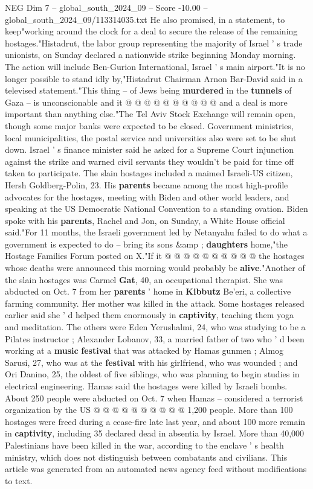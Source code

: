 \begin{textsample}{NEG Dim 7 – global\_south\_2024\_09 – Score -10.00 – global\_south\_2024\_09/113314035.txt}
He also promised, in a statement, to keep"working around the clock for a deal to secure the release of the remaining hostages."Histadrut, the labor group representing the majority of Israel ' s trade unionists, on Sunday declared a nationwide strike beginning Monday morning.
The action will include Ben-Gurion International, Israel ' s main airport."It is no longer possible to stand idly by,"Histadrut Chairman Arnon Bar-David said in a televised statement."This thing -- of Jews being \textbf{murdered} in the \textbf{tunnels} of Gaza -- is unconscionable and it @ @ @ @ @ @ @ @ @ @ and a deal is more important than anything else."The Tel Aviv Stock Exchange will remain open, though some major banks were expected to be closed.
Government ministries, local municipalities, the postal service and universities also were set to be shut down.
Israel ' s finance minister said he asked for a Supreme Court injunction against the strike and warned civil servants they wouldn't be paid for time off taken to participate.
The slain hostages included a maimed Israeli-US citizen, Hersh Goldberg-Polin, 23.
His \textbf{parents} became among the most high-profile advocates for the hostages, meeting with Biden and other world leaders, and speaking at the US Democratic National Convention to a standing ovation.
Biden spoke with his \textbf{parents}, Rachel and Jon, on Sunday, a White House official said."For 11 months, the Israeli government led by Netanyahu failed to do what a government is expected to do -- bring its sons \&amp ; \textbf{daughters} home,"the Hostage Families Forum posted on X."If it @ @ @ @ @ @ @ @ @ @ the hostages whose deaths were announced this morning would probably be \textbf{alive}."Another of the slain hostages was Carmel \textbf{Gat}, 40, an occupational therapist.
She was abducted on Oct. 7 from her \textbf{parents} ' home in \textbf{Kibbutz} Be'eri, a collective farming community.
Her mother was killed in the attack.
Some hostages released earlier said she ' d helped them enormously in \textbf{captivity}, teaching them yoga and meditation.
The others were Eden Yerushalmi, 24, who was studying to be a Pilates instructor ; Alexander Lobanov, 33, a married father of two who ' d been working at a \textbf{music} \textbf{festival} that was attacked by Hamas gunmen ; Almog Sarusi, 27, who was at the \textbf{festival} with his girlfriend, who was wounded ; and Ori Danino, 25, the oldest of five siblings, who was planning to begin studies in electrical engineering.
Hamas said the hostages were killed by Israeli bombs.
About 250 people were abducted on Oct. 7 when Hamas -- considered a terrorist organization by the US @ @ @ @ @ @ @ @ @ @ 1,200 people.
More than 100 hostages were freed during a cease-fire late last year, and about 100 more remain in \textbf{captivity}, including 35 declared dead in absentia by Israel.
More than 40,000 Palestinians have been killed in the war, according to the enclave ' s health ministry, which does not distinguish between combatants and civilians.
This article was generated from an automated news agency feed without modifications to text.

\end{textsample}
